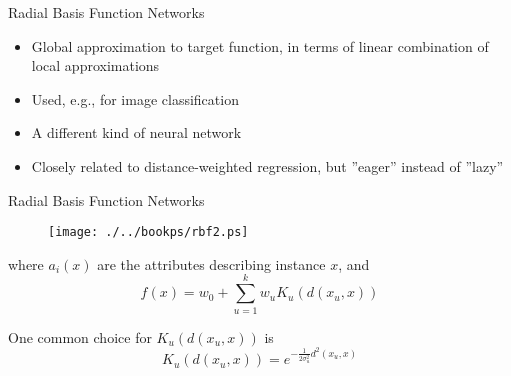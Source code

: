 \documentclass[%
pdf,
colorBG,
slideColor,
tcrico,
]{prosper}
\begin{document}

\begin{slide}{Radial Basis Function Networks }

\begin{itemize}
\item Global approximation to target function, in terms of linear combination
of local approximations

\item  Used, e.g., for image classification

\item A different kind of neural network

\item Closely related to distance-weighted regression, but ''eager'' instead of ''lazy''
\end{itemize}
\end{slide}



\begin{slide}{Radial Basis Function Networks }
\tiny
\begin{figure}
	\centering
	\texttt{[image: ./../bookps/rbf2.ps]}
\end{figure}

where $a_i(x)$ are the attributes describing instance $x$, and
\[ f(x) =  w_0 + \sum_{u=1}^{k} w_u K_u(d(x_u,x))  \]

One common choice for $K_u(d(x_u,x))$ is
\[ K_u(d(x_u,x)) = e^{- \frac{1}{2 \sigma_u^2}d^2(x_u,x)} \]
\end{slide}

\end{document}
